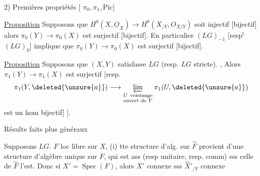 2) Premières propriétés [ $\pi_0,\pi_1,\mathrm{Pic}$]

\uline{Proposition} Supposons que $H^0(X,\underline{O}_X)\longrightarrow H^0(X_{/Y},O_{X/Y})$ soit injectif [bijectif] alors $\pi_0(Y)\longrightarrow\pi_0(X)$ est surjectif [bijectif]. En particulier $(LG)_{-1}$ [resp$^{\mathrm{t}}$ $(LG)_0$] implique que $\pi_0(Y)\longrightarrow\pi_0(X)$ est surjectif [bijectif].

\uline{Proposition}  Supposons que $(X,Y)$ satisfasse  $LG$ (resp. $LG$ stricte). , Alors $\pi_1(Y)\longrightarrow\pi_1(X)$ est surjectif [resp.
\[
\pi_1(Y,\deleted{\unsure{a}})\longrightarrow
\varprojlim_{\substack{U\ \text{voisinage}\\\text{ouvert de }Y}}\pi_1(U,\deleted{\unsure{a}})
\]
est un hom \deleted{surjectif [resp.} bijectif] ].

Résulte  faits plus généraux

\uline{} Supposons $LG$.   $F$ loc libre sur $X$, (i) tte structure d'alg.   sur $\hat F$ provient d'une structure d'algèbre unique sur $F$, qui est ass (resp unitaire, resp. comm) sss celle de $\hat F$ l'est.  Donc si $X'=\operatorname{Spec}(F)$, alors $X'$ connexe sss $\hat X'_{/Y}$ connexe


